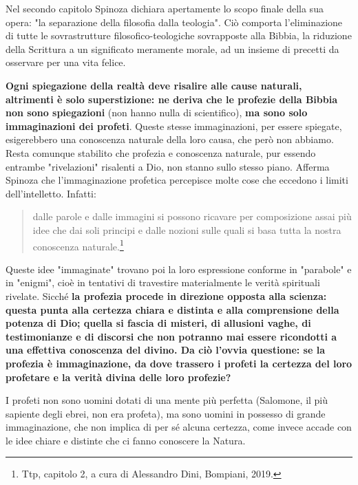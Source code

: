 Nel secondo capitolo Spinoza dichiara apertamente lo scopo finale della sua opera: "la separazione della filosofia dalla teologia". Ciò comporta l'eliminazione di tutte le sovrastrutture filosofico-teologiche sovrapposte alla Bibbia, la riduzione della
Scrittura a un significato meramente morale, ad un insieme di precetti da osservare per una vita felice.

\textbf{Ogni spiegazione della realtà deve risalire alle cause naturali, altrimenti
è solo superstizione: ne deriva che le profezie della Bibbia non
sono spiegazioni} (non hanno nulla di scientifico), \textbf{ma sono solo immaginazioni dei profeti}. Queste
stesse immaginazioni, per essere spiegate, esigerebbero una conoscenza naturale della loro causa,
che però non abbiamo. Resta comunque stabilito che profezia e conoscenza naturale, pur essendo
entrambe "rivelazioni" risalenti a Dio, non stanno sullo
stesso piano. Afferma Spinoza che l'immaginazione profetica percepisce
molte cose che eccedono i limiti dell'intelletto. Infatti: 

\begin{quotation}
	\small dalle parole e dalle immagini si possono
	ricavare per composizione assai più idee che dai soli principi e dalle nozioni sulle quali si basa tutta
	la nostra conoscenza naturale.\footnote{Ttp, capitolo 2, a cura di Alessandro Dini, Bompiani, 2019.}
\end{quotation}

Queste idee "immaginate" trovano poi la loro espressione
conforme in "parabole" e in "enigmi", cioè in tentativi di travestire materialmente le verità spirituali
rivelate. Sicché \textbf{la profezia procede in direzione opposta alla scienza: questa punta alla
certezza chiara e distinta e alla comprensione della potenza di Dio; quella si fascia di misteri, di allusioni vaghe, di testimonianze e di discorsi che non potranno
mai essere ricondotti a una effettiva conoscenza del divino. Da ciò l'ovvia questione: se
la profezia è immaginazione,
da dove trassero i profeti la certezza del loro profetare e la verità divina
delle loro profezie?}



I profeti non sono uomini dotati di una mente più perfetta
(Salomone, il più sapiente degli ebrei, non era profeta), ma sono uomini in possesso di grande immaginazione, che non implica di per sé alcuna certezza, come invece accade con le idee chiare e
distinte che ci fanno conoscere la Natura.

